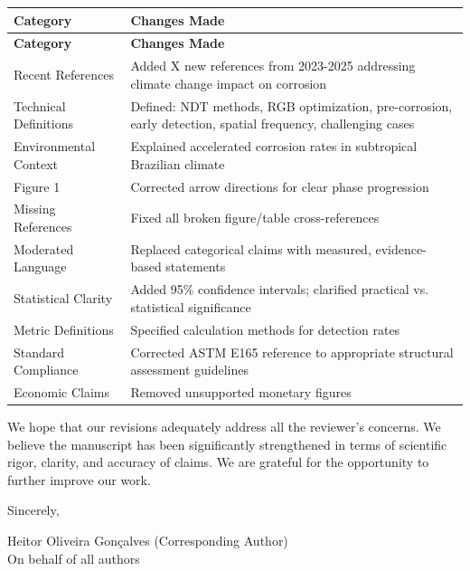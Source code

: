 \documentclass[11pt]{article}
\begin{document}
\begin{longtable}{p{4cm}p{10cm}}
\toprule
\textbf{Category} & \textbf{Changes Made} \\
\midrule
\endfirsthead
\toprule
\textbf{Category} & \textbf{Changes Made} \\
\midrule
\endhead
\bottomrule
\endlastfoot

Recent References & Added X new references from 2023-2025 addressing climate change impact on corrosion \\
\midrule
Technical Definitions & Defined: NDT methods, RGB optimization, pre-corrosion, early detection, spatial frequency, challenging cases \\
\midrule
Environmental Context & Explained accelerated corrosion rates in subtropical Brazilian climate \\
\midrule
Figure 1 & Corrected arrow directions for clear phase progression \\
\midrule
Missing References & Fixed all broken figure/table cross-references \\
\midrule
Moderated Language & Replaced categorical claims with measured, evidence-based statements \\
\midrule
Statistical Clarity & Added 95\% confidence intervals; clarified practical vs. statistical significance \\
\midrule
Metric Definitions & Specified calculation methods for detection rates \\
\midrule
Standard Compliance & Corrected ASTM E165 reference to appropriate structural assessment guidelines \\
\midrule
Economic Claims & Removed unsupported monetary figures \\
\bottomrule
\end{longtable}

\vspace{1cm}

\noindent We hope that our revisions adequately address all the reviewer's concerns. We believe the manuscript has been significantly strengthened in terms of scientific rigor, clarity, and accuracy of claims. We are grateful for the opportunity to further improve our work.

\vspace{0.5cm}

\noindent Sincerely,

\vspace{0.5cm}

\noindent Heitor Oliveira Gonçalves (Corresponding Author)\\
On behalf of all authors
\end{document}
